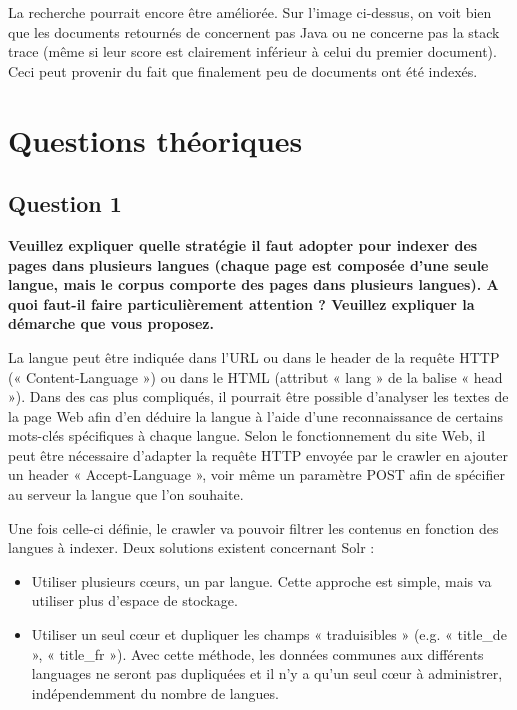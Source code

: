 \documentclass[a4paper]{article}
\begin{document}
	La recherche pourrait encore être améliorée.
	Sur l'image ci-dessus, on voit bien que les documents retournés de concernent pas Java
	ou ne concerne pas la stack trace (même si leur score est clairement inférieur à celui du premier document).
	Ceci peut provenir du fait que finalement peu de documents ont été indexés.

	\section{Questions théoriques}

	\subsection{Question 1}
	{\bfseries
	Veuillez expliquer quelle stratégie il faut adopter pour indexer des pages dans plusieurs langues
	(chaque page est composée d'une seule langue, mais le corpus comporte des pages dans plusieurs langues).
	A quoi faut-il faire particulièrement attention ? Veuillez expliquer la démarche que vous proposez. 
	}

	La langue peut être indiquée dans l'URL ou dans le header de la requête HTTP (« Content-Language »)
	ou dans le HTML (attribut « lang » de la balise « head »).
	Dans des cas plus compliqués, il pourrait être possible d'analyser les textes de la page Web
	afin d'en déduire la langue à l'aide d'une reconnaissance de certains mots-clés spécifiques à chaque langue.
	Selon le fonctionnement du site Web, il peut être nécessaire d'adapter la requête HTTP envoyée par le crawler en ajouter un header « Accept-Language »,
	voir même un paramètre POST afin de spécifier au serveur la langue que l'on souhaite.

	Une fois celle-ci définie, le crawler va pouvoir filtrer les contenus en fonction des langues à indexer.
	Deux solutions existent concernant Solr :

	\begin{itemize}
		\item Utiliser plusieurs cœurs, un par langue. Cette approche est simple,
		mais va utiliser plus d'espace de stockage.
		\item Utiliser un seul cœur et dupliquer les champs « traduisibles » (e.g. « title\_de », « title\_fr »).
		Avec cette méthode, les données communes aux différents languages ne seront pas dupliquées
		et il n'y a qu'un seul cœur à administrer, indépendemment du nombre de langues.
	\end{itemize}
\end{document}
